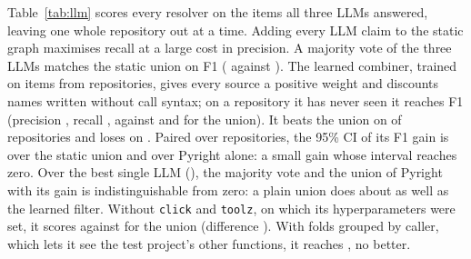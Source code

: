 {Table~\ref{tab:llm} scores every resolver on the items all three LLMs answered, leaving one
whole repository out at a time. Adding every LLM claim to the static graph maximises recall at a large
cost in precision. A majority vote of the three LLMs matches the static union on F1
(\loroMajorityFone{} against \loroUnionFone). The learned combiner, trained on \nCombItems{} items
from \nCombRepos{} repositories, gives every source a positive weight and discounts names written
without call syntax; on a repository it has never seen it reaches F1 \loroCombFone{} (precision
\loroCombP, recall \loroCombR, against \loroUnionP{} and \loroUnionR{} for the union). It beats the
union on \nLoroBeats{} of \nLoroRepos{} repositories and loses on \nLoroWorse. Paired over
repositories, the 95\% CI of its F1 gain is \ciLoroDiffUnion{} over the static union and
\ciLoroDiffPyright{} over Pyright alone: a small gain whose interval reaches zero. Over the best single LLM (\bestLlm), the majority vote
and the union of Pyright with \bestLlm{} its gain is indistinguishable from zero: a plain union does
about as well as the learned filter. Without \texttt{click} and \texttt{toolz}, on which its hyperparameters were set, it scores
\loroNorefCombFone{} against \loroNorefUnionFone{} for the union (difference \ciLoroNorefDiffUnion). With folds grouped by
caller, which lets it see the test project's other functions, it reaches \cvCombFone, no better.}

\renewcommand{\rqDiscussionLlm}{Static analysis is precise but blind to dispatch over shared
names and to references; the LLMs see those but over-claim, and neither sees implicit calls, the
largest class of misses. Neither is enough alone; combined,
whether by a learned filter or by a plain union of Pyright and the best LLM, they give a small F1
gain on unseen repositories
(\loroUnionFone{} to \loroCombFone). A tool that
consumes call graphs can treat LLM answers as a second vote, not as a replacement.}

\renewcommand{\rqConclusion}{the union of two static analysers finds a median of \edgeUnionMed{} of
the calls per repository (\poolRecallUnion{} pooled). Most of what it misses are implicit calls that
no call site names, then calls through shared method names; reflection accounts for
\pctMissReflective. LLMs recover many of the named misses at a cost in precision,
and combining the two, whether by a learned filter or a plain union, gives only a small F1 gain on
unseen repositories (\loroUnionFone{} to \loroCombFone).}
